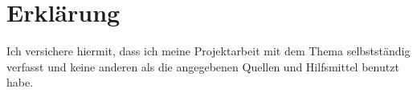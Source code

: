 \section*{Erklärung}
Ich versichere hiermit, dass ich meine Projektarbeit mit
dem Thema 
\textbf{\thetitle} selbstständig verfasst und keine anderen als die
angegebenen Quellen und Hilfsmittel benutzt habe.


